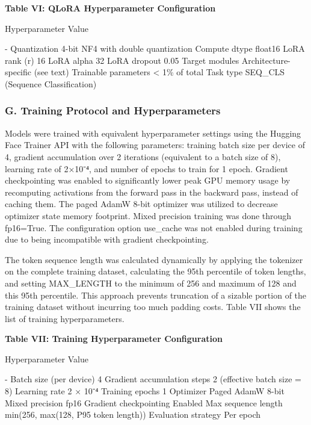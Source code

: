 \textbf{Table VI: QLoRA Hyperparameter Configuration}

Hyperparameter \textbar{} Value \textbar{}

\textbar\textbar-\textbar{} \textbar{} Quantization \textbar{} 4-bit NF4
with double quantization \textbar{} \textbar{} Compute dtype \textbar{}
float16 \textbar{} \textbar{} LoRA rank (r) \textbar{} 16 \textbar{}
\textbar{} LoRA alpha \textbar{} 32 \textbar{} \textbar{} LoRA dropout
\textbar{} 0.05 \textbar{} \textbar{} Target modules \textbar{}
Architecture-specific (see text) \textbar{} \textbar{} Trainable
parameters \textbar{} \textless{} 1\% of total \textbar{} \textbar{}
Task type \textbar{} SEQ\_CLS (Sequence Classification) \textbar{}

\subsubsection{G. Training Protocol and
Hyperparameters}\label{g.-training-protocol-and-hyperparameters}

Models were trained with equivalent hyperparameter settings using the
Hugging Face Trainer API with the following parameters: training batch
size per device of 4, gradient accumulation over 2 iterations
(equivalent to a batch size of 8), learning rate of 2×10⁻⁴, and number
of epochs to train for 1 epoch. Gradient checkpointing was enabled to
significantly lower peak GPU memory usage by recomputing activations
from the forward pass in the backward pass, instead of caching them. The
paged AdamW 8-bit optimizer was utilized to decrease optimizer state
memory footprint. Mixed precision training was done through fp16=True.
The configuration option use\_cache was not enabled during training due
to being incompatible with gradient checkpointing.

The token sequence length was calculated dynamically by applying the
tokenizer on the complete training dataset, calculating the 95th
percentile of token lengths, and setting MAX\_LENGTH to the minimum of
256 and maximum of 128 and this 95th percentile. This approach prevents
truncation of a sizable portion of the training dataset without
incurring too much padding costs. Table VII shows the list of training
hyperparameters.

\textbf{Table VII: Training Hyperparameter Configuration}

Hyperparameter \textbar{} Value \textbar{}

\textbar\textbar-\textbar{} \textbar{} Batch size (per device)
\textbar{} 4 \textbar{} \textbar{} Gradient accumulation steps
\textbar{} 2 (effective batch size = 8) \textbar{} \textbar{} Learning
rate \textbar{} 2 × 10⁻⁴ \textbar{} \textbar{} Training epochs
\textbar{} 1 \textbar{} \textbar{} Optimizer \textbar{} Paged AdamW
8-bit \textbar{} \textbar{} Mixed precision \textbar{} fp16 \textbar{}
\textbar{} Gradient checkpointing \textbar{} Enabled \textbar{}
\textbar{} Max sequence length \textbar{} min(256, max(128, P95 token
length)) \textbar{} \textbar{} Evaluation strategy \textbar{} Per epoch
\textbar{}

